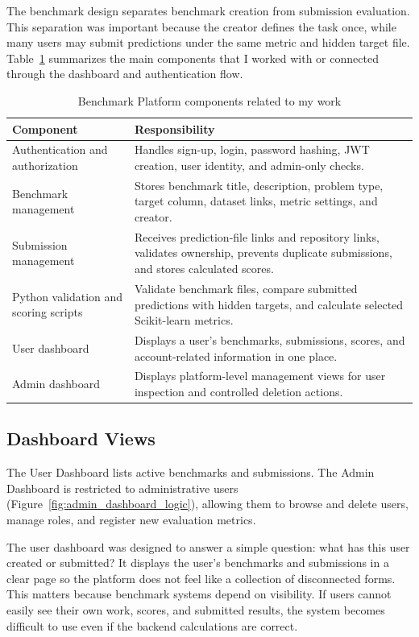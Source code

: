 \documentclass[12pt,a4paper,oneside]{report}
\begin{document}
The benchmark design separates benchmark creation from submission evaluation. This separation was important because the creator defines the task once, while many users may submit predictions under the same metric and hidden target file. Table~\ref{tab:benchmark-components-individual} summarizes the main components that I worked with or connected through the dashboard and authentication flow.

\begin{table}[H]
\centering
\small
\caption{Benchmark Platform components related to my work}
\label{tab:benchmark-components-individual}
\begin{tabularx}{\textwidth}{p{}X}
\toprule
\textbf{Component} & \textbf{Responsibility} \\
\midrule
Authentication and authorization &
Handles sign-up, login, password hashing, JWT creation, user identity, and admin-only checks. \\
\midrule
Benchmark management &
Stores benchmark title, description, problem type, target column, dataset links, metric settings, and creator. \\
\midrule
Submission management &
Receives prediction-file links and repository links, validates ownership, prevents duplicate submissions, and stores calculated scores. \\
\midrule
Python validation and scoring scripts &
Validate benchmark files, compare submitted predictions with hidden targets, and calculate selected Scikit-learn metrics. \\
\midrule
User dashboard &
Displays a user's benchmarks, submissions, scores, and account-related information in one place. \\
\midrule
Admin dashboard &
Displays platform-level management views for user inspection and controlled deletion actions. \\
\bottomrule
\end{tabularx}
\end{table}

\subsection{Dashboard Views}
The User Dashboard lists active benchmarks and submissions. The Admin Dashboard is restricted to administrative users (Figure~\ref{fig:admin_dashboard_logic}), allowing them to browse and delete users, manage roles, and register new evaluation metrics.

The user dashboard was designed to answer a simple question: what has this user created or submitted? It displays the user's benchmarks and submissions in a clear page so the platform does not feel like a collection of disconnected forms. This matters because benchmark systems depend on visibility. If users cannot easily see their own work, scores, and submitted results, the system becomes difficult to use even if the backend calculations are correct.
\end{document}
